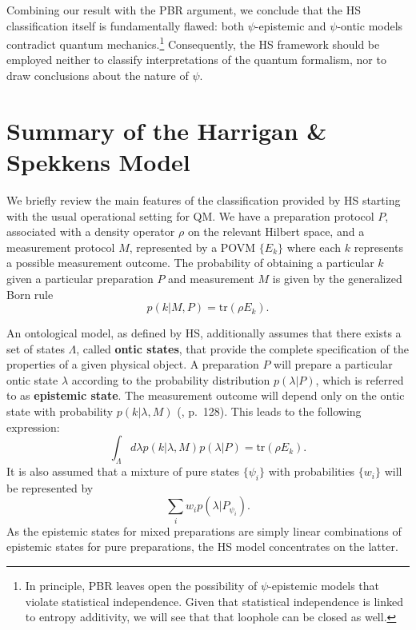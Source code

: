 \documentclass[10pt,twocolumn, nofootinbib]{revtex4-2}
\begin{document}
Combining our result with the PBR argument, we conclude that the HS classification itself is fundamentally flawed: both $\psi$-epistemic and $\psi$-ontic models contradict quantum mechanics.\footnote{In principle, PBR leaves open the possibility of $\psi$-epistemic models that violate statistical independence. Given that statistical independence is linked to entropy additivity, we will see that that loophole can be closed as well.} Consequently, the HS framework should be employed neither to classify interpretations of the quantum formalism, nor to draw conclusions about the nature of $\psi$. 

\section{Summary of the Harrigan \& Spekkens Model}

We briefly review the main features of the classification provided by HS starting with the usual operational setting for QM. We have a preparation protocol $P$, associated with a density operator $\rho$ on the relevant Hilbert space, and a measurement protocol $M$, represented by a POVM $\{ E_k\}$ where each $k$ represents a possible measurement outcome. The probability of obtaining a particular $k$ given a particular preparation $P$ and measurement $M$ is given by the generalized Born rule
\begin{equation}
	p(k|M, P)=\textrm{tr}(\rho E_k).
\end{equation}

An ontological model, as defined by HS, additionally assumes that there exists a set of states $\Lambda$, called \textbf{ontic states}, that provide the complete specification of the properties of a given physical object. A preparation $P$ will prepare a particular ontic state $\lambda$ according to the probability distribution $p(\lambda | P)$, which is referred to as \textbf{epistemic state}. The measurement outcome will depend only on the ontic state with probability $p(k|\lambda, M)$ (\cite{Harrigan:2010}, p.\ 128). This leads to the following expression:
\begin{equation}
	\int_\Lambda d\lambda p(k|\lambda, M) p(\lambda| P)= \textrm{tr}(\rho E_k).
\end{equation}
It is also assumed that a mixture of pure states $\{ \psi_i \}$ with probabilities $\{ w_i \}$ will be represented by
\begin{equation}\label{epistemic_mixing}
	\sum_i  w_i p(\lambda| P_{\psi_i}).
\end{equation}
As the epistemic states for mixed preparations are simply linear combinations of epistemic states for pure preparations, the HS model concentrates on the latter.
\end{document}
